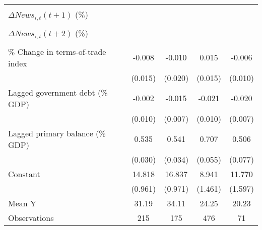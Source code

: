 {\begin{tabular}{l*{4}{c}}
                    &                     &                     &                     &                     \\
\addlinespace
$ \Delta News_{i,t}(t+1)$ (\%)&                     &                     &                     &                     \\
                    &                     &                     &                     &                     \\
\addlinespace
$ \Delta News_{i,t}(t+2)$ (\%)&                     &                     &                     &                     \\
                    &                     &                     &                     &                     \\
\addlinespace
\% Change in terms-of-trade index&      -0.008         &      -0.010         &       0.015         &      -0.006         \\
                    &     (0.015)         &     (0.020)         &     (0.015)         &     (0.010)         \\
\addlinespace
Lagged government debt (\% GDP)&      -0.002         &      -0.015\sym{**} &      -0.021\sym{**} &      -0.020\sym{**} \\
                    &     (0.010)         &     (0.007)         &     (0.010)         &     (0.007)         \\
\addlinespace
Lagged primary balance (\% GDP)&       0.535\sym{***}&       0.541\sym{***}&       0.707\sym{***}&       0.506\sym{***}\\
                    &     (0.030)         &     (0.034)         &     (0.055)         &     (0.077)         \\
\addlinespace
Constant            &      14.818\sym{***}&      16.837\sym{***}&       8.941\sym{***}&      11.770\sym{***}\\
                    &     (0.961)         &     (0.971)         &     (1.461)         &     (1.597)         \\
\midrule
Mean Y              &       31.19         &       34.11         &       24.25         &       20.23         \\
Observations        &         215         &         175         &         476         &          71         \\
\bottomrule
\end{tabular}
}
